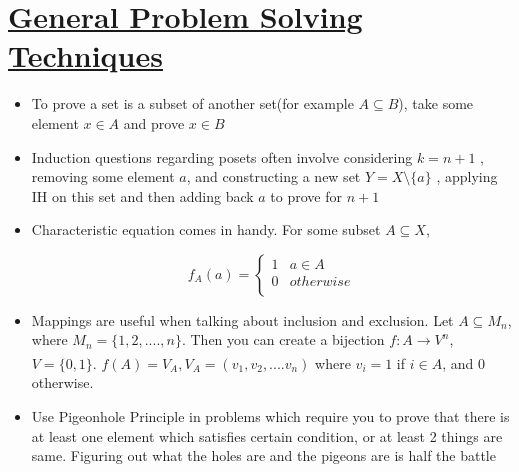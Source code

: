 \documentclass{article}
\theoremstyle{definition}
\theoremstyle{definition}
\theoremstyle{named}
\begin{document}
 



\section{\underline{General Problem Solving Techniques}}
\begin{itemize}
\item To prove a set is a subset of another set(for example $A \subseteq B$), take some element $x \in A$ and prove $x \in B$ 
\item Induction questions regarding posets often involve considering $k=n+1$ , removing some element $a$, and constructing a new set $Y = X \setminus  \{a\}$ , applying IH on this set and then adding back $a$ to prove for $n+1$
\item  Characteristic equation comes in handy. For some subset $A \subseteq X$, 


\[
f_A(a) =\left\{
\begin{array}{ll}
      1 & a \in  A\\
      0 & otherwise \\
\end{array} 
\right.
        \]

\item Mappings are useful when talking about inclusion and exclusion. Let $A \subseteq M_n$, where $M_n = \{1, 2, ...., n\}$. Then you can create a bijection $f:A \xrightarrow[]{} V^{n}$, $V = \{0, 1\}$. $f(A) = V_A, V_A = (v_1, v_2, .... v_n)$ where $v_i = 1$ if $i \in A$, and 0 otherwise. 

\item Use Pigeonhole Principle in problems which require you to prove that there is at least one element which satisfies certain condition, or at least 2 things are same. Figuring out what the holes are and the pigeons are is half the battle 

\end{itemize}
\end{document}
